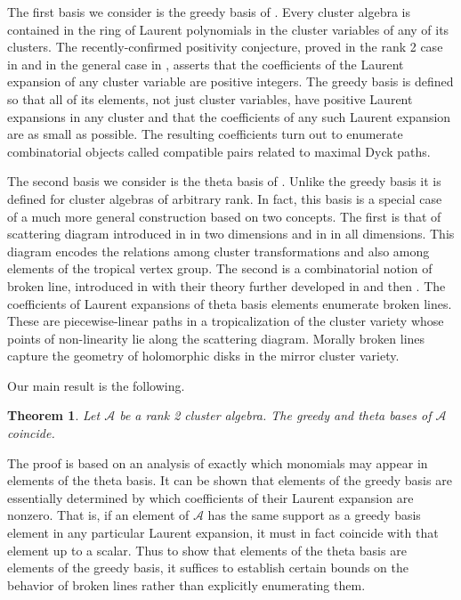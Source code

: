 \documentclass[11pt]{amsart}
\newtheorem{theorem}{Theorem}[section]
\theoremstyle{remark}
\numberwithin{equation}{section}
\begin{document}
The first basis we consider is the greedy basis of \cite{LLZ}.  Every cluster algebra is contained in the ring of Laurent polynomials in the cluster variables of any of its clusters.  The recently-confirmed positivity conjecture, proved in the rank 2 case in \cite{LS,Rup} and in the general case in \cite{LS2,GHKK}, asserts that the coefficients of the Laurent expansion of any cluster variable are positive integers.  The greedy basis is defined so that all of its elements, not just cluster variables, have positive Laurent expansions in any cluster and that the coefficients of any such Laurent expansion are as small as possible.  The resulting coefficients turn out to enumerate combinatorial objects called compatible pairs related to maximal Dyck paths.

The second basis we consider is the theta basis of \cite{GHKK}.  Unlike the
greedy basis it is defined for cluster algebras of arbitrary rank.  In fact,
this basis is a special case of a much more general construction based on two
concepts. The first is that of scattering diagram introduced in \cite{KS} in two
dimensions and in \cite{GS} in all dimensions.   This diagram
encodes the relations among cluster transformations and also among elements of the
tropical vertex group.  The second is a combinatorial
notion of broken line, introduced in \cite{G10} with their theory further
developed in \cite{CPS} and then \cite{GHK11}.  The coefficients of Laurent
expansions of theta basis elements enumerate broken lines.  These are piecewise-linear paths in a tropicalization of the cluster variety
whose points of non-linearity lie along the scattering diagram.   Morally
broken lines capture the geometry of holomorphic disks in the mirror cluster variety.

Our main result is the following.
\begin{theorem}
Let $\mathcal{A}$ be a rank 2 cluster algebra.  The greedy and theta bases of $\mathcal{A}$ coincide.
\end{theorem}

The proof is based on an analysis of exactly which monomials may appear in elements of the theta basis.  It can be shown that elements of the greedy basis are essentially determined by which coefficients of their Laurent expansion are nonzero.  That is, if an element of $\mathcal{A}$ has the same support as a greedy basis element in any particular Laurent expansion, it must in fact coincide with that element up to a scalar.  Thus to show that elements of the theta basis are elements of the greedy basis, it suffices to establish certain bounds on the behavior of broken lines rather than explicitly enumerating them.
\end{document}
